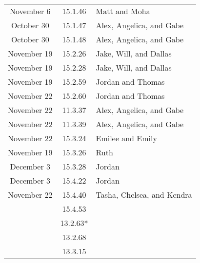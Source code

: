 \documentclass[12pt]{amsart}
\begin{document}
\begin{longtable}{c|c|l}
        November 6      & 15.1.46                              & Matt and Moha                            \\
        October 30      & 15.1.47                              & Alex, Angelica, and Gabe                 \\
        October 30      & 15.1.48                              & Alex, Angelica, and Gabe                 \\
        November 19     & 15.2.26                              & Jake, Will, and Dallas                   \\
        November 19     & 15.2.28                              & Jake, Will, and Dallas                   \\
        November 19     & 15.2.59                              & Jordan and Thomas                        \\
        November 22     & 15.2.60                              & Jordan and Thomas                        \\
        November 22     & 11.3.37                              & Alex, Angelica, and Gabe                 \\
        November 22     & 11.3.39                              & Alex, Angelica, and Gabe                 \\
        November 22     & 15.3.24                              & Emilee and Emily                         \\
        November 19     & 15.3.26                              & Ruth                                     \\
        December 3      & 15.3.28                              & Jordan                                   \\
        December 3      & 15.4.22                              & Jordan                                   \\
        November 22     & 15.4.40                              & Tasha, Chelsea, and Kendra               \\
                        & 15.4.53                              &                                          \\
                        & 13.2.63*                             &                                          \\
                        & 13.2.68                              &                                          \\
                        & 13.3.15                              &                                          \\

\end{longtable}
\end{document}
